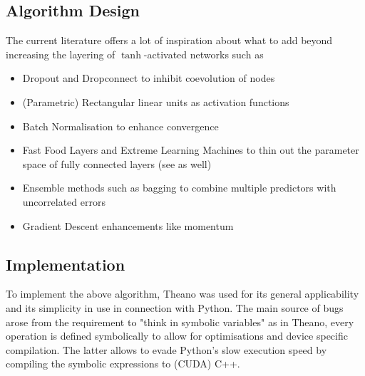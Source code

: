 \documentclass[]{article}
\begin{document}
\subsection{Algorithm Design}
The current literature offers a lot of inspiration about what to add beyond increasing the layering of $\tanh$-activated networks such as 
\begin{itemize}
	\item Dropout \cite{Hinton2012,Srivastava2014} and Dropconnect \cite{Wan2013} to inhibit coevolution of nodes
	\item (Parametric) \cite{He2015} Rectangular linear units as activation functions \cite{Nair2010}
	\item Batch Normalisation \cite{Ioffe2015} to enhance convergence
	\item Fast Food Layers \cite{Yang2014} and Extreme Learning Machines \cite{Huang2006} to thin out the parameter space of fully connected layers (see \cite{Denil2013} as well)
	\item Ensemble methods such as bagging \cite{Breiman1996} to combine multiple predictors with uncorrelated errors
	\item Gradient Descent enhancements like momentum \cite{IlyaSutskever}
\end{itemize}
\subsection{Implementation}
To implement the above algorithm, Theano \cite{Bergstra2010} was used for its general applicability and its simplicity in use in connection with Python. The main source of bugs arose from the requirement to "think in symbolic variables" as in Theano, every operation is defined symbolically to allow for optimisations and device specific compilation. The latter allows to evade Python's slow execution speed by compiling the symbolic expressions to (CUDA) C++.
\end{document}
